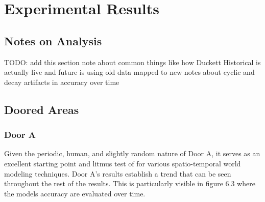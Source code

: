 

\chapter{Experimental Results}

\section{ Notes on Analysis }
TODO: add this section\?
note about common things like how Duckett Historical is actually live and future is using old data mapped to new
notes about cyclic and decay artifacts in accuracy over time

\section{ Doored Areas }

\subsection { Door A }

Given the periodic, human, and slightly random nature of Door A, it serves as
an excellent starting point and litmus test of for various spatio-temporal
world modeling techniques. Door A's results establish a trend that can be seen
throughout the rest of the results. This is particularly visible in figure 6.3
where the models accuracy are evaluated over time. \\

\begin{table}[h!]
  \centering
  \caption{Door A Data Overview}
\end{table}

